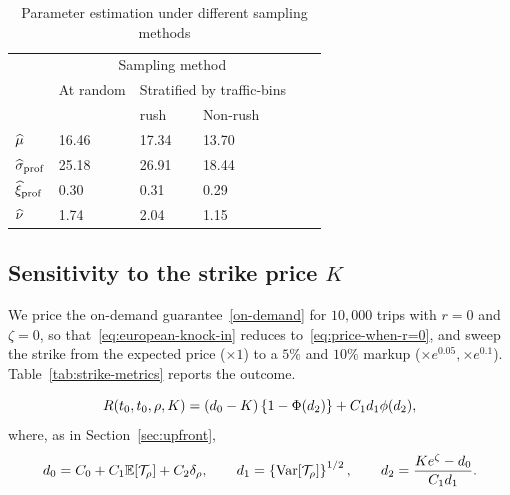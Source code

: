 \documentclass[12pt]{article}
\begin{document}
{{{{{{{{\begin{table}[!htp]
  \centering
    \caption{Parameter estimation under different sampling methods}
    \label{tb:parameter-estimates}
    {\footnotesize 
  \begin{tabular}{l lllll}
                      & \multicolumn{3}{c}{Sampling method}                                \\
                      & At random         & \multicolumn{2}{c}{Stratified by traffic-bins} \\[5pt]
                     
                      &                   & {rush} & {Non-rush}                         \\
    \({\widehat \mu}\)        & 16.46             & 17.34     & 13.70                              \\   
    \(\widehat \sigma_\text{prof}\) & 25.18             & 26.91     & 18.44                              \\
    \midrule
    \({\widehat{\xi}_\text{prof}}\)        & 0.30              & 0.31     & 0.29                               \\
    \({\widehat \nu}\)        & 1.74              & 2.04      & 1.15
  \end{tabular}
  }
  \par\vspace{4pt}

\end{table}

 
\subsection{Sensitivity to the strike price $K$}\label{sec:strike-sensitivity}
We price the on-demand guarantee~\ref{on-demand} for $10,000$ trips with $r=0$ and $\zeta=0$, so that~\eqref{eq:european-knock-in} reduces to~\eqref{eq:price-when-r=0}, and sweep the strike from the expected price ($\times 1$) to a $5\%$ and $10\%$ markup ($\times e^{0.05}, \times e^{0.1}$). Table~\ref{tab:strike-metrics} reports the outcome. 

\begin{equation}\label{eq:price-when-r=0}
R(t_0,t_0, \rho, K) = (d_0-K)\left\{1- \Phi(d_2)\right\} + C_1d_1\phi(d_2),
\end{equation} 
where, as in Section~\ref{sec:upfront},
\[
d_0 = C_0 + C_1\mathbb{E}[\mathcal{T}_\rho] + C_2\delta_\rho, \qquad
d_1 = \left\{\operatorname{{\rm Var}}[\mathcal{T}_\rho]\right\}^{1/2}, \qquad
d_2 = \frac{Ke^\zeta -d_0}{C_1d_1}.
\]

}}}}}}}}
\end{document}
